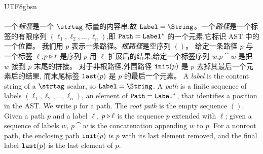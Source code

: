 \begin{CJK*}{UTF8}{gbsn}
\paragraph{}
\ifPaperChinese
一个\emph{标签}是一个 $\strtag$ 标量的内容串,故 $\Label = \String$。一个\emph{路径}是一个标签的有限序列
$(\ell_1, \ell_2, \ldots, \ell_n)$,即 $\mathtt{Path} = \mathtt{Label}^{*}$ 的一个元素,它标识 AST 中的一个位置。
我们用 $p$ 表示一条路径。\emph{根路径}是空序列 $()$。
给定一条路径 $p$ 与一个标签 $\ell$,$p \mathbin{\triangleright} \ell$ 是序列 $p$ 用 $\ell$ 扩展后的结果;给定一个标签序列 $w$,$p \cat w$ 是把 $w$ 接到 $p$ 末尾的拼接。
对于非根路径,外围路径 $\mathtt{init}(p)$ 是 $p$ 去掉其最后一个元素后的结果,
而末尾标签 $\mathtt{last}(p)$ 是 $p$ 的最后一个元素。
\else
A \emph{label} is the content string of a $\strtag$ scalar, so $\Label = \String$.
A \emph{path} is a finite sequence of labels
$(\ell_1, \ell_2, \ldots, \ell_n)$, an element of $\mathtt{Path} = \mathtt{Label}^{*}$, that
identifies a position in the AST.
We write $p$ for a path. The \emph{root path} is the empty sequence $()$.
Given a path $p$ and a label $\ell$, $p \mathbin{\triangleright} \ell$ is the sequence $p$
extended with $\ell$; given a sequence of labels $w$, $p \cat w$ is the
concatenation appending $w$ to $p$. For a nonroot path, the enclosing path $\mathtt{init}(p)$ is $p$
with its last element removed, and the final label $\mathtt{last}(p)$ is the last
element of $p$.
\fi


\end{CJK*}
